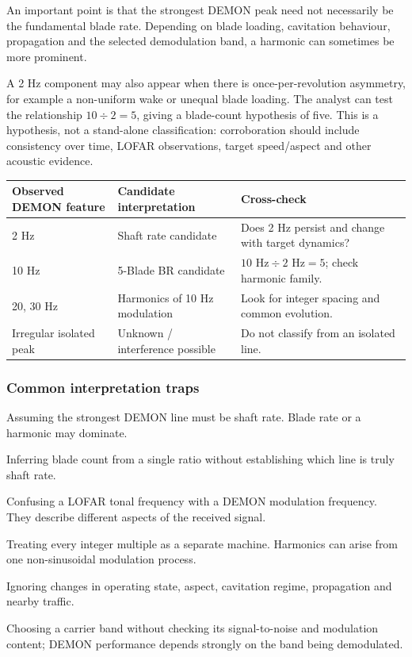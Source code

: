 An important point is that the strongest DEMON peak need not necessarily be the fundamental blade rate. Depending on blade loading, cavitation behaviour, propagation and the selected demodulation band, a harmonic can sometimes be more prominent.

A 2 Hz component may also appear when there is once-per-revolution asymmetry, for example a non-uniform wake or unequal blade loading. The analyst can test the relationship $10\div2 = 5$, giving a blade-count hypothesis of five. This is a hypothesis, not a stand-alone classification: corroboration should include consistency over time, LOFAR observations, target speed/aspect and other acoustic evidence.

\begin{tabularx}{\linewidth}{l X X}
    \toprule
    \textbf{Observed DEMON feature} & \textbf{Candidate interpretation} & \textbf{Cross-check} \\
    \midrule
    \rowcolor[gray]{0.8}2 Hz & Shaft rate candidate & Does 2 Hz persist and change with target dynamics?\\
    10 Hz & 5-Blade BR candidate & $10 \text{ Hz} \div 2 \text{ Hz} = 5$; check harmonic family. \\
    \rowcolor[gray]{0.8}20, 30 Hz & Harmonics of 10 Hz modulation & Look for integer spacing and common evolution.\\
    Irregular isolated peak & Unknown / interference possible & Do not classify from an isolated line. \\
    \bottomrule
\end{tabularx}

\subsubsection{Common interpretation traps}
\begin{compactitem}
    \item Assuming the strongest DEMON line must be shaft rate. Blade rate or a harmonic may dominate.
    \item Inferring blade count from a single ratio without establishing which line is truly shaft rate.
    \item Confusing a LOFAR tonal frequency with a DEMON modulation frequency. They describe different aspects of the received signal.
    \item Treating every integer multiple as a separate machine. Harmonics can arise from one non-sinusoidal modulation process.
    \item Ignoring changes in operating state, aspect, cavitation regime, propagation and nearby traffic.
    \item Choosing a carrier band without checking its signal-to-noise and modulation content; DEMON performance depends strongly on the band being demodulated.
\end{compactitem}


